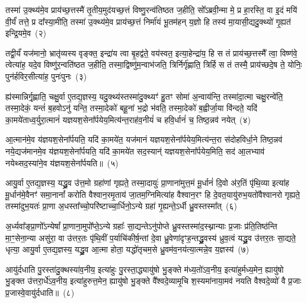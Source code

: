 तस्मा॑ उ॒क्थ्य॑मे॒व प्राय॑च्छ॒त्तस्मै॑ तृ॒तीय॒मुद॑यच्छ॒त्तं विष्णु॒रन्व॑तिष्ठत ज॒हीति॒ सो᳚\-ऽब्रवी॒न्मा मे॒ प्र हा॒रस्ति॒ वा इ॒दं मयि॑ वी॒र्यं॑ तत्ते॒ प्र दा᳚स्या॒मीति॒ तस्मा॑ उ॒क्थ्य॑मे॒व प्राय॑च्छ॒त्तं निर्मा॑यं भू॒तम॑हन् य॒ज्ञो हि तस्य॑ मा॒यासी॒द्यदु॒क्थ्यो॑ गृ॒ह्यत॑ इन्द्रि॒यमे॒व~(२)

तद्वी॒र्यं॑ यज॑मानो॒ भ्रातृ॑व्यस्य वृङ्क्त॒ इन्द्रा॑य त्वा बृ॒हद्व॑ते॒ वय॑स्वत॒ इत्या॒हेन्द्रा॑य॒ हि स तं प्राय॑च्छ॒त्तस्मै᳚ त्वा॒ विष्ण॑वे॒ त्वेत्या॑ह॒ यदे॒व विष्णु॑र॒न्वति॑ष्ठत ज॒हीति॒ तस्मा॒द्विष्णु॑म॒न्वाभ॑जति॒ त्रिर्निर्गृ॑ह्णाति॒ त्रिर्\mbox{}हि स तं तस्मै॒ प्राय॑च्छदे॒ष ते॒ योनिः॒ पुन॑र्\mbox{}हविर॒सीत्या॑ह॒ पुनः॑पुनः~(३)

ह्य॑स्मान्निर्गृ॒ह्णाति॒ चक्षु॒र्वा ए॒तद्य॒ज्ञस्य॒ यदु॒क्थ्य॑स्तस्मा॑दु॒क्थ्यꣳ॑ हु॒तꣳ सोमा॑ अ॒न्वाय॑न्ति॒ तस्मा॑दा॒त्मा चक्षु॒रन्वे॑ति॒ तस्मा॒देकं॒ यन्तं॑ ब॒हवो\-ऽनु॑ यन्ति॒ तस्मा॒देको॑ बहू॒नां भ॒द्रो भ॑वति॒ तस्मा॒देको॑ ब॒ह्वीर्जा॒या वि॑न्दते॒ यदि॑ का॒मये॑ताध्व॒र्युरा॒त्मानं॑ यज्ञयश॒सेना᳚र्पयेय॒मित्य॑न्त॒राह॑व॒नीयं॑ च हवि॒र्धानं॑ च॒ तिष्ठ॒न्नव॑ नयेत्~(४)

आ॒त्मान॑मे॒व य॑ज्ञयश॒सेना᳚र्पयति॒ यदि॑ का॒मये॑त॒ यज॑मानं यज्ञयश॒सेना᳚र्पयेय॒मित्य॑न्त॒रा स॑दोहविर्धा॒ने तिष्ठ॒न्नव॑ नये॒द्यज॑मानमे॒व य॑ज्ञयश॒सेना᳚र्पयति॒ यदि॑ का॒मये॑त सद॒स्यान्॑ यज्ञयश॒सेना᳚र्पयेय॒मिति॒ सद॑ आ॒लभ्याव॑ नयेथ्सद॒स्या॑ने॒व य॑ज्ञयश॒सेना᳚र्पयति॥~(५)

{\anuvakamend[{इती᳚न्द्रि॒यमे॒व पुनः॑पुनर्नये॒त्त्रय॑स्त्रिꣳशच्च}]}%

आयु॒र्वा ए॒तद्य॒ज्ञस्य॒ यद्ध्रु॒व उ॑त्त॒मो ग्रहा॑णां गृह्यते॒ तस्मा॒दायुः॑ प्रा॒णाना॑मुत्त॒मं मू॒र्धानं॑ दि॒वो अ॑र॒तिं पृ॑थि॒व्या इत्या॑ह मू॒र्धान॑मे॒वैनꣳ॑ समा॒नानां᳚ करोति वैश्वान॒रमृ॒ताय॑ जा॒तम॒ग्निमित्या॑ह वैश्वान॒रꣳ हि दे॒वत॒यायु॑रुभ॒यतो॑वैश्वानरो गृह्यते॒ तस्मा॑दुभ॒यतः॑ प्रा॒णा अ॒धस्ता᳚च्चो॒परि॑ष्टाच्चा॒र्धिनो॒\-ऽन्ये ग्रहा॑ गृ॒ह्यन्ते॒\-ऽर्धी ध्रु॒वस्तस्मा᳚त्~(६)

अ॒र्ध्यवा᳚ङ्प्रा॒णो᳚\-ऽन्येषां᳚ प्रा॒णाना॒मुपो᳚प्ते॒\-ऽन्ये ग्रहाः᳚ सा॒द्यन्ते\-ऽनु॑पोप्ते ध्रु॒वस्तस्मा॑द॒स्थ्नान्याः प्र॒जाः प्र॑ति॒तिष्ठ॑न्ति मा॒ꣳ॒सेना॒न्या असु॑रा॒ वा उ॑त्तर॒तः पृ॑थि॒वीं प॒र्याचि॑कीर्\mbox{}ष॒न्तां दे॒वा ध्रु॒वेणा॑दृꣳह॒न्तद्ध्रु॒वस्य॑ ध्रुव॒त्वं यद्ध्रु॒व उ॑त्तर॒तः सा॒द्यते॒ धृत्या॒ आयु॒र्वा ए॒तद्य॒ज्ञस्य॒ यद्ध्रु॒व आ॒त्मा होता॒ यद्धो॑तृचम॒से ध्रु॒वम॑व॒नय॑त्या॒त्मन्ने॒व य॒ज्ञस्य॑~(७)

आयु॑र्दधाति पु॒रस्ता॑दु॒क्थस्या॑व॒नीय॒ इत्या॑हुः पु॒रस्ता॒द्ध्यायु॑षो भु॒ङ्क्ते म॑ध्य॒तो॑\-ऽव॒नीय॒ इत्या॑हुर्मध्य॒मेन॒ ह्यायु॑षो भु॒ङ्क्त उ॑त्तरा॒र्धे॑\-ऽव॒नीय॒ इत्या॑हुरुत्त॒मेन॒ ह्यायु॑षो भु॒ङ्क्ते वै᳚श्वदे॒व्यामृ॒चि श॒स्यमा॑नाया॒मव॑ नयति वैश्वदे॒व्यो॑ वै प्र॒जाः प्र॒जास्वे॒वायु॑र्दधाति॥~(८)

